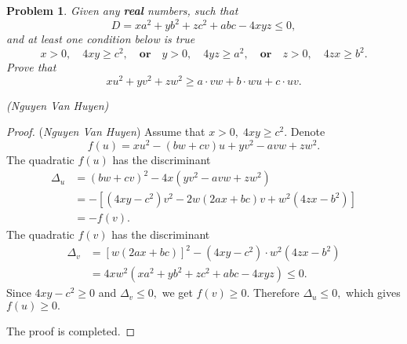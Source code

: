 \documentclass[12pt,a4paper]{book}
\theoremstyle{plain}
\newtheorem*{pro}{\cmss\problemColor Problem}
\begin{document}
\begin{pro}
Given any \textbf{real} numbers, such that
\[D = xa^2 + yb^2 + zc^2 + abc - 4 xyz \le 0,\]
and at least one condition below is true
\[x > 0, \quad 4xy \ge c^2, \quad \mathbf{or} \quad y > 0, \quad 4yz \ge a^2, \quad \mathbf{or} \quad z > 0, \quad 4zx \ge b^2.\]
Prove that
\begin{equation}\label{eq15}
xu^2 + yv^2 + zw^2  \ge a \cdot vw + b \cdot wu + c \cdot uv.
\end{equation}
\begin{flushright}(Nguyen Van Huyen)\end{flushright}
\end{pro}

\begin{proof} %
(\textit{Nguyen Van Huyen}) Assume that $x > 0, \; 4 xy \ge c^2.$ Denote
\[f(u) = xu^2 - (bw+cv)u + yv^2-avw+zw^2.\]
The quadratic $f(u)$ has the discriminant
\[\begin{aligned}
\Delta_{u} &= (bw+cv)^2 - 4x(yv^2-avw+zw^2) \\
& = -\left[(4xy - c^2)v^2 - 2w(2ax+bc)v + w^2(4zx - b^2)\right] \\
& = - f(v).
\end{aligned}\]
The quadratic $f(v)$ has the discriminant
\[\begin{aligned}
\Delta_v & = [w(2ax+bc)]^2 - (4xy - c^2) \cdot w^2(4zx - b^2) \\
& = 4xw^2(xa^2 + yb^2 + zc^2 + abc - 4 xyz) \le 0.
\end{aligned}\]
Since $4xy - c^2 \ge 0$ and $\Delta_v \le 0,$ we get $f(v) \ge 0.$ Therefore $\Delta_u \le 0,$ which gives $f(u) \ge 0.$

The proof is completed.
\end{proof}
\end{document}
